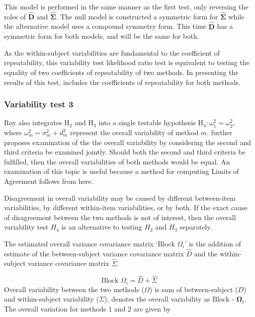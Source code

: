 \documentclass[12pt, a4paper]{report}
\theoremstyle{plain}
\theoremstyle{definition}
\theoremstyle{remark}
\begin{document}
	This model is performed in the same manner as the first test, only reversing the roles of $\boldsymbol{\hat{D}}$ and $\boldsymbol{\hat{\Sigma}}$. The null model is constructed a symmetric form for $\boldsymbol{\hat{\Sigma}}$ while the alternative model uses a compound symmetry form. This time $\boldsymbol{\hat{D}}$ has a symmetric form for both models, and will be the same for both.
	
	As the within-subject variabilities are fundamental to the coefficient of repeatability, this variability test likelihood ratio test is equivalent to testing the equality of two coefficients of repeatability of two methods. In presenting the results of this test, \citet{ARoy2009} includes the coefficients of repeatability for both methods.


	\subsubsection{Variability test 3}
	Roy also integrates $\mathrm{H}_2$ and $\mathrm{H}_3$ into a single testable hypothesis $\mathrm{H}_4\colon \omega^2_1=\omega^2_2,$ where $\omega^2_m = \sigma^2_m + d^2_m$ represent the overall variability of method $m.$ 		\citet{ARoy2009} further proposes examination of the the overall variability by considering the second and third criteria be examined jointly. Should both the second and third criteria be fulfilled, then the overall variabilities of both methods would be equal. An examination of this topic is useful because a method for computing Limits of Agreement follows from here.
		

	
	
	Disagreement in overall variability may be caused by different between-item variabilities, by different within-item variabilities, or by both.  If the exact cause of disagreement between the two methods is not of interest, then the overall variability test $H_4$ is an alternative to testing $H_2$ and $H_3$ separately.
	
		The estimated overall variance covariance matrix `Block
		$\Omega_{i}$' is the addition of estimate of the between-subject variance covariance matrix $\hat{D}$ and the within-subject variance covariance matrix $\hat{\Sigma}$.
		
		\begin{equation}
		\mbox{Block  }\Omega_{i} = \hat{D} + \hat{\Sigma}
		\end{equation}
		Overall variability between the two methods ($\Omega$) is sum of between-subject ($D$) and within-subject variability ($\Sigma$),
		\citet{ARoy2009} denotes the overall variability	as ${\mbox{Block - }\boldsymbol \Omega_{i}}$. The overall variation for methods $1$ and $2$ are given by
		
\end{document}
